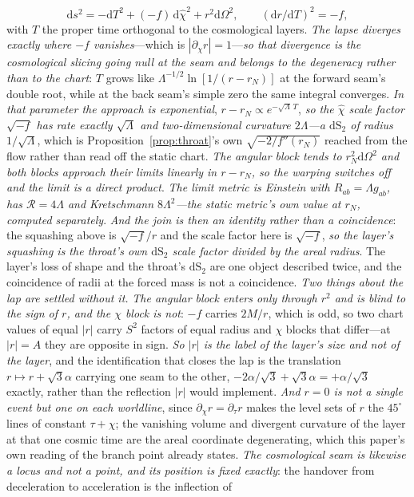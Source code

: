 \documentclass[11pt,a4paper]{article}
\theoremstyle{plain}
\theoremstyle{definition}
\theoremstyle{remark}
\newcommand{\dS}{\mathrm{dS}}
\newcommand{\dd}{\mathrm{d}}   %
\begin{document}
\begin{equation}
\dd s^2=-\dd T^2+(-f)\,\dd\hat\chi^2+r^2\dd\Omega^2,\qquad (\dd r/\dd T)^2=-f,
\label{eq:layer-proper}
\end{equation}
with $T$ the proper time orthogonal to the cosmological layers. \emph{The lapse diverges exactly where $-f$ vanishes}---which is $|\partial_\chi r|=1$---\emph{so that divergence is the cosmological slicing going null at the seam and belongs to the degeneracy rather than to the chart}: $T$ grows like $\Lambda^{-1/2}\ln[1/(r-r_{N})]$ at the forward seam's double root, while at the back seam's simple zero the same integral converges. \emph{In that parameter the approach is exponential}, $r-r_{N}\propto e^{-\sqrt\Lambda\,T}$, \emph{so the $\hat\chi$ scale factor $\sqrt{-f}$ has rate exactly $\sqrt\Lambda$ and two-dimensional curvature $2\Lambda$---a $\dS_2$ of radius $1/\sqrt\Lambda$}, which is Proposition~\ref{prop:throat}'s own $\sqrt{-2/f''(r_{N})}$ reached from the flow rather than read off the static chart. \emph{The angular block tends to $r_{N}^2\dd\Omega^2$ and both blocks approach their limits linearly in $r-r_{N}$, so the warping switches off and the limit is a direct product}. \emph{The limit metric is Einstein with $R_{ab}=\Lambda g_{ab}$, has $\mathcal R=4\Lambda$ and Kretschmann $8\Lambda^2$---the static metric's own value at $r_{N}$, computed separately}. \emph{And the join is then an identity rather than a coincidence}: the squashing above is $\sqrt{-f}/r$ and the scale factor here is $\sqrt{-f}$, \emph{so the layer's squashing is the throat's own $\dS_2$ scale factor divided by the areal radius}. The layer's loss of shape and the throat's $\dS_2$ are one object described twice, and the coincidence of radii at the forced mass is not a coincidence. \emph{Two things about the lap are settled without it.} \emph{The angular block enters only through $r^2$ and is blind to the sign of $r$, and the $\chi$ block is not}: $-f$ carries $2M/r$, which is odd, so two chart values of equal $|r|$ carry $S^2$ factors of equal radius and $\chi$ blocks that differ---at $|r|=A$ they are opposite in sign. \emph{So $|r|$ is the label of the layer's size and not of the layer}, and the identification that closes the lap is the translation $r\mapsto r+\sqrt3\alpha$ carrying one seam to the other, $-2\alpha/\sqrt3+\sqrt3\alpha=+\alpha/\sqrt3$ exactly, rather than the reflection $|r|$ would implement. \emph{And $r=0$ is not a single event but one on each worldline}, since $\partial_\chi r=\partial_\tau r$ makes the level sets of $r$ the $45^\circ$ lines of constant $\tau+\chi$; the vanishing volume and divergent curvature of the layer at that one cosmic time are the areal coordinate degenerating, which this paper's own reading of the branch point already states. \emph{The cosmological seam is likewise a locus and not a point, and its position is fixed exactly}: the handover from deceleration to acceleration is the inflection of 
\end{document}
